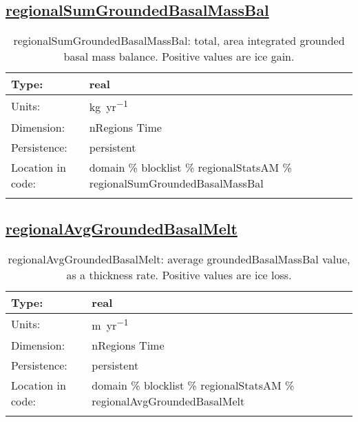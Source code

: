 \subsection[regionalSumGroundedBasalMassBal]{\hyperref[sec:var_tab_regionalStatsAM]{regionalSumGroundedBasalMassBal}}
\label{subsec:var_sec_regionalStatsAM_regionalSumGroundedBasalMassBal}
\begin{center}
\begin{longtable}{| p{2.0in} | p{4.0in} |}
        \hline 
        Type: & real \\
        \hline 
        Units: & \si{kg.yr^{-1}} \\
        \hline 
        Dimension: & nRegions Time \\
        \hline 
        Persistence: & persistent \\
        \hline 
         Location in code: & domain \% blocklist \% regionalStatsAM \% regionalSumGroundedBasalMassBal \\
         \hline 
    \caption{regionalSumGroundedBasalMassBal: total, area integrated grounded basal mass balance. Positive values are ice gain.}
\end{longtable}
\end{center}
\subsection[regionalAvgGroundedBasalMelt]{\hyperref[sec:var_tab_regionalStatsAM]{regionalAvgGroundedBasalMelt}}
\label{subsec:var_sec_regionalStatsAM_regionalAvgGroundedBasalMelt}
\begin{center}
\begin{longtable}{| p{2.0in} | p{4.0in} |}
        \hline 
        Type: & real \\
        \hline 
        Units: & \si{m.yr^{-1}} \\
        \hline 
        Dimension: & nRegions Time \\
        \hline 
        Persistence: & persistent \\
        \hline 
         Location in code: & domain \% blocklist \% regionalStatsAM \% regionalAvgGroundedBasalMelt \\
         \hline 
    \caption{regionalAvgGroundedBasalMelt: average groundedBasalMassBal value, as a thickness rate. Positive values are ice loss.}
\end{longtable}
\end{center}
